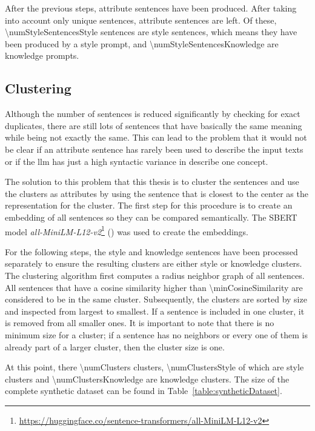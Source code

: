 After the previous steps, \numStyleSentencesNotUniqueText{} attribute sentences have been produced. After taking into account only unique sentences, \numStyleSentencesText{} attribute sentences are left. Of these, \num{\numStyleSentencesStyle} sentences are style sentences, which means they have been produced by a style prompt, and \num{\numStyleSentencesKnowledge} are knowledge prompts.

\subsection{Clustering}
\label{sec:experiments:setup:clustering}
Although the number of sentences is reduced significantly by checking for exact duplicates, there are still lots of sentences that have basically the same meaning while being not exactly the same. This can lead to the problem that it would not be clear if an attribute sentence has rarely been used to describe the input texts or if the \ac{llm} has just a high syntactic variance in describe one concept.

The solution to this problem that this thesis is to cluster the sentences and use the clusters as attributes by using the sentence that is closest to the center as the representation for the cluster.
The first step for this procedure is to create an embedding of all sentences so they can be compared semantically. The SBERT model \textit{all-MiniLM-L12-v2}\footnote{\url{https://huggingface.co/sentence-transformers/all-MiniLM-L12-v2}} (\cite{reimersSentenceBERTSentenceEmbeddings2019}) was used to create the embeddings.

For the following steps, the style and knowledge sentences have been processed separately to ensure the resulting clusters are either style or knowledge clusters.
The clustering algorithm first computes a radius neighbor graph of all sentences. All sentences that have a cosine similarity higher than \num{\minCosineSimilarity} are considered to be in the same cluster. Subsequently, the clusters are sorted by size and inspected from largest to smallest. If a sentence is included in one cluster, it is removed from all smaller ones. It is important to note that there is no minimum size for a cluster; if a sentence has no neighbors or every one of them is already part of a larger cluster, then the cluster size is one.


At this point, there \num{\numClusters} clusters, \num{\numClustersStyle} of which are style clusters and \num{\numClustersKnowledge} are knowledge clusters. The size of the complete synthetic dataset can be found in Table~\ref{table:syntheticDataset}.

